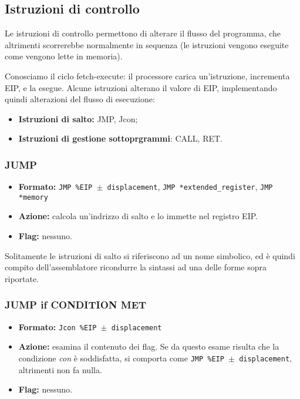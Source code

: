 \documentclass[a4paper,11pt]{article}
\begin{document}
\subsection{Istruzioni di controllo}
Le istruzioni di controllo permettono di alterare il flusso del programma, che altrimenti scorrerebbe normalmente in sequenza (le istruzioni vengono eseguite come vengono lette in memoria).

Conosciamo il ciclo fetch-execute: il processore carica un'istruzione, incrementa EIP, e la esegue.
Alcune istruzioni alterano il valore di EIP, implementando quindi alterazioni del flusso di esecuzione:
\begin{itemize}
	\item \textbf{Istruzioni di salto:} JMP, Jcon;
	\item \textbf{Istruzioni di gestione sottoprgrammi}: CALL, RET.
\end{itemize}

\subsubsection{JUMP}
\begin{itemize}
	\item \textbf{Formato:} \texttt{JMP  \%EIP $\pm$ displacement}, \texttt{JMP *extended\_register}, \texttt{JMP *memory}
	\item \textbf{Azione:} calcola un'indrizzo di salto e lo immette nel registro EIP. 
	\item \textbf{Flag:} nessuno. 
\end{itemize}

Solitamente le istruzioni di salto si riferiscono ad un nome simbolico, ed è quindi compito dell'assemblatore ricondurre la sintassi ad una delle forme sopra riportate.

\subsubsection{JUMP if CONDITION MET}
\begin{itemize}
	\item \textbf{Formato:} \texttt{Jcon \%EIP $\pm$ displacement}
	\item \textbf{Azione:} esamina il contenuto dei flag.
		Se da questo esame risulta che la condizione \textit{con} è soddisfatta, si comporta come \texttt{JMP \%EIP $\pm$ displacement}, altrimenti non fa nulla.
	\item \textbf{Flag:} nessuno. 
\end{itemize}
\end{document}
